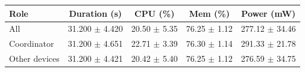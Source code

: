 \begin{tabular}{lcccc}
\hline
\textbf{Role} & \textbf{Duration (s)} & \textbf{CPU (\%)} & \textbf{Mem (\%)} & \textbf{Power (mW)} \\
\hline
All & 31.200 $\pm$ 4.420 & 20.50 $\pm$ 5.35 & 76.25 $\pm$ 1.12 & 277.12 $\pm$ 34.46 \\
Coordinator & 31.200 $\pm$ 4.651 & 22.71 $\pm$ 3.39 & 76.30 $\pm$ 1.14 & 291.33 $\pm$ 21.78 \\
Other devices & 31.200 $\pm$ 4.421 & 20.42 $\pm$ 5.40 & 76.25 $\pm$ 1.12 & 276.59 $\pm$ 34.75 \\
\hline
\end{tabular}
